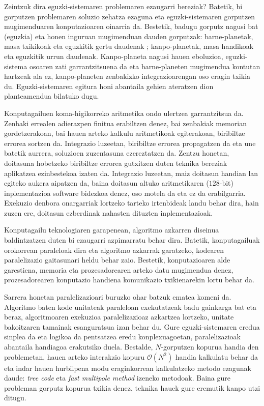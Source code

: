 Zeintzuk dira eguzki-sistemaren problemaren ezaugarri bereziak? Batetik, bi gorputzen problemaren  soluzio zehatza ezaguna eta eguzki-sistemaren gorputzen mugimenduaren konputazioaren oinarria da. Bestetik,  badugu gorputz nagusi bat (eguzkia) eta honen inguruan mugimenduan dauden gorputzak: barne-planetak, masa txikikoak eta eguzkitik gertu daudenak ; kanpo-planetak, masa handikoak eta eguzkitik urrun daudenak. Kanpo-planeta nagusi hauen eboluzioa, eguzki-sistema osoaren zati garrantzitsuena da eta barne-planeten mugimendua kontutan hartzeak ala ez, kanpo-planeten zenbakizko integrazioarengan oso eragin txikia du. Eguzki-sistemaren egitura honi abantaila gehien ateratzen dion planteamendua bilatuko dugu.
  
Konputagailuen koma-higikorreko aritmetika ondo ulertzea garrantzitsua da. Zenbaki errealen adierazpen finitua erabiltzen denez, bai zenbakiak memorian gordetzerakoan, bai hauen arteko kalkulu aritmetikoak egiterakoan, biribiltze errorea sortzen da. Integrazio luzeetan, biribiltze errorea propagatzen da eta une batetik aurrera, soluzioen zuzentasuna ezereztatzen da. Zentzu honetan, doitasuna hobetzeko biribiltze errorea gutxitzen duten teknika bereziak aplikatzea ezinbestekoa izaten da. Integrazio luzeetan, maiz doitasun handian lan egiteko aukera aipatzen da, baina doitasun altuko aritmetikaren ($128$-bit) inplementazioa software bidezkoa denez, oso motela da eta ez da erabilgarria. Exekuzio denbora onargarriak lortzeko tarteko irtenbideak landu behar dira, hain zuzen ere, doitasun ezberdinak nahasten dituzten inplementazioak.       

Konputagailu teknologiaren garapenean, algoritmo azkarren diseinua baldintzatzen duten bi ezaugarri azpimarratu behar dira. Batetik, konputagailuak orokorrean paraleloak dira eta algoritmo azkarrak garatzeko, kodearen paralelizazio gaitasunari heldu behar zaio. Bestetik, konputazioaren alde garestiena, memoria eta prozesadorearen arteko datu mugimendua denez, prozesadorearen konputazio handiena komunikazio txikienarekin lortu behar da. 

Sarrera honetan paralelizazioari buruzko ohar batzuk ematea komeni da. Algoritmo baten kode unitateak paraleloan exekutatzeak badu gainkarga bat eta beraz,  algoritmoaren exekuzioa paralelizazioaz azkartzea lortzeko,  unitate bakoitzaren tamainak esanguratsua izan behar du. Gure eguzki-sistemaren eredua sinplea da eta logikoa da pentsatzea eredu konplexuagoetan, paralelizazioak abantaila handiagoa erakutsiko duela. Bestalde, $N$-gorputzen kopurua handia den problemetan, hauen arteko interakzio kopuru $\mathcal{O}(N^2)$ handia kalkulatu behar da eta indar hauen hurbilpena modu eraginkorrean kalkulatzeko metodo ezagunak daude: \textit {tree code}\cite{Barnes1986} eta \textit {fast multipole method}\cite{Carrier1988} izeneko metodoak. Baina gure probleman gorputz kopurua txikia denez, teknika hauek gure eremutik kanpo utzi ditugu. 


